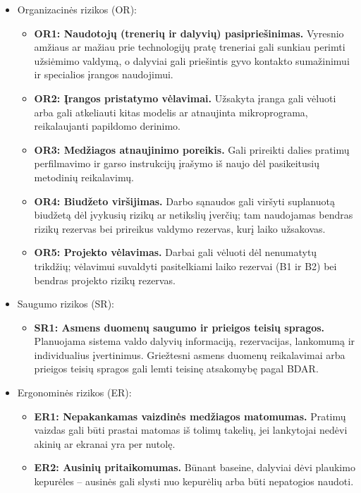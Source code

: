 \begin{itemize}
    \begin{itemize}
        \item \textbf{IR1: Grotuvų, ekranų ar sporto salės kolonėlių ribojimai.} Skirtinguose baseinuose ir sporto centruose naudojama aparatūra gali nepalaikyti planuojamų programinių sąsajų ar turėti techninių apribojimų. 
        \item \textbf{IR2: Radijo siųstuvo ir mikrofono sujungimas.} Neaiški radijo siųstuvo ir trenerio mikrofono sujungimo grandinė, galinti kelti garso perdavimo nesklandumų.
    \end{itemize}
    \item Organizacinės rizikos (OR):
    \begin{itemize}
        \item \textbf{OR1: Naudotojų (trenerių ir dalyvių) pasipriešinimas.} Vyresnio amžiaus ar mažiau prie technologijų pratę treneriai gali sunkiau perimti užsiėmimo valdymą, o dalyviai gali priešintis gyvo kontakto sumažinimui ir specialios įrangos naudojimui.
        \item \textbf{OR2: Įrangos pristatymo vėlavimai.} Užsakyta įranga gali vėluoti arba gali atkeliauti kitas modelis ar atnaujinta mikroprograma, reikalaujanti papildomo derinimo.
        \item \textbf{OR3: Medžiagos atnaujinimo poreikis.} Gali prireikti dalies pratimų perfilmavimo ir garso instrukcijų įrašymo iš naujo dėl pasikeitusių metodinių reikalavimų.
        \item \textbf{OR4: Biudžeto viršijimas.} Darbo sąnaudos gali viršyti suplanuotą biudžetą dėl įvykusių rizikų ar netikslių įverčių; tam naudojamas bendras rizikų rezervas bei prireikus valdymo rezervas, kurį laiko užsakovas.
        \item \textbf{OR5: Projekto vėlavimas.} Darbai gali vėluoti dėl nenumatytų trikdžių; vėlavimui suvaldyti pasitelkiami laiko rezervai (B1 ir B2) bei bendras projekto rizikų rezervas.
    \end{itemize}
    \item Saugumo rizikos (SR):
    \begin{itemize}
        \item \textbf{SR1: Asmens duomenų saugumo ir prieigos teisių spragos.} Planuojama sistema valdo dalyvių informaciją, rezervacijas, lankomumą ir individualius įvertinimus. Griežtesni asmens duomenų reikalavimai arba prieigos teisių spragos gali lemti teisinę atsakomybę pagal BDAR.
    \end{itemize}
    \item Ergonominės rizikos (ER):
    \begin{itemize}
        \item \textbf{ER1: Nepakankamas vaizdinės medžiagos matomumas.} Pratimų vaizdas gali būti prastai matomas iš tolimų takelių, jei lankytojai nedėvi akinių ar ekranai yra per nutolę.
        \item \textbf{ER2: Ausinių pritaikomumas.} Būnant baseine, dalyviai dėvi plaukimo kepurėles – ausinės gali slysti nuo kepurėlių arba būti nepatogios naudoti.
    \end{itemize}
\end{itemize}


